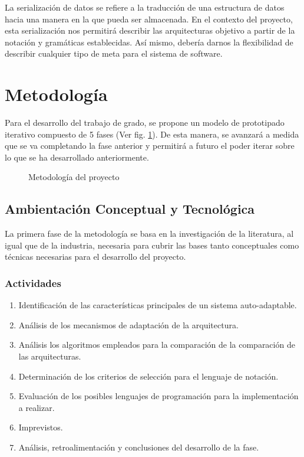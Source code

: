 \documentclass[12pt]{article}
\begin{document}

    La serialización de datos se refiere a la traducción de una estructura de datos hacia una manera en la que pueda ser almacenada. En el contexto del proyecto, esta serialización nos permitirá describir las arquitecturas objetivo a partir de la notación y gramáticas establecidas. Así mismo, debería darnos la flexibilidad de describir cualquier tipo de meta para el sistema de software.
    

    \section{Metodología}

    Para el desarrollo del trabajo de grado, se propone un modelo de prototipado iterativo compuesto de 5 fases (Ver fig. \ref{fig:met}). De esta manera, se avanzará a medida que se va completando la fase anterior y permitirá a futuro el poder iterar sobre lo que se ha desarrollado anteriormente.

    \begin{figure}[H]
        \centering
        
        \caption{Metodología del proyecto}
        \label{fig:met}
    \end{figure}

    \subsection{Ambientación Conceptual y Tecnológica}

    La primera fase de la metodología se basa en la investigación de la literatura, al igual que de la industria, necesaria para cubrir las bases tanto conceptuales como técnicas necesarias para el desarrollo del proyecto. 

    \subsubsection*{Actividades}

    \begin{enumerate}[label=\thesubsection.\arabic*., wide, labelindent=2em, leftmargin=5em]
        \item Identificación de las características principales de un sistema auto-adaptable.
        \item Análisis de los mecanismos de adaptación de la arquitectura.
        \item Análisis los algoritmos empleados para la comparación de la comparación de las arquitecturas.
        \item Determinación de los criterios de selección para el lenguaje de notación.
        \item Evaluación de los posibles lenguajes de programación para la implementación a realizar.
        \item Imprevistos.
        \item Análisis, retroalimentación y conclusiones del desarrollo de la fase. 
    \end{enumerate} 
\end{document}
